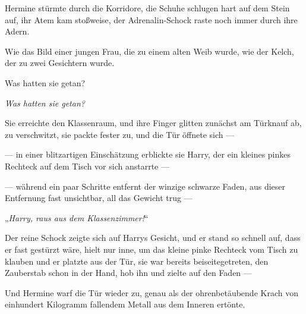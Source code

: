 \later

Hermine stürmte durch die Korridore, die Schuhe schlugen hart auf dem Stein auf, ihr Atem kam stoßweise, der Adrenalin-Schock raste noch immer durch ihre Adern.

Wie das Bild einer jungen Frau, die zu einem alten Weib wurde, wie der Kelch, der zu zwei Gesichtern wurde.

Was hatten sie getan?

\emph{Was hatten sie getan?}

Sie erreichte den Klassenraum, und ihre Finger glitten zunächst am Türknauf ab, zu verschwitzt, sie packte fester zu, und die Tür öffnete sich —

— in einer blitzartigen Einschätzung erblickte sie Harry, der ein kleines pinkes Rechteck auf dem Tisch vor sich anstarrte —

— während ein paar Schritte entfernt der winzige schwarze Faden, aus dieser Entfernung fast unsichtbar, all das Gewicht trug —

„\emph{Harry, raus aus dem Klassenzimmer!}“

Der reine Schock zeigte sich auf Harrys Gesicht, und er stand so schnell auf, dass er fast gestürzt wäre, hielt nur inne, um das kleine pinke Rechteck vom Tisch zu klauben und er platzte aus der Tür, sie war bereits beiseitegetreten, den Zauberstab schon in der Hand, hob ihn und zielte auf den Faden —


Und Hermine warf die Tür wieder zu, genau als der ohrenbetäubende Krach von einhundert Kilogramm fallendem Metall aus dem Inneren ertönte.

